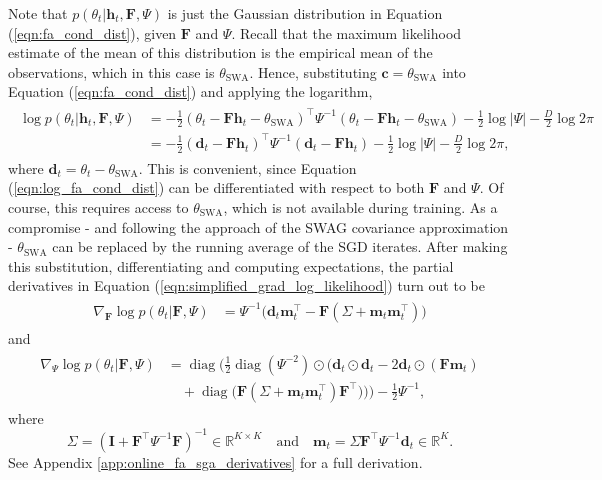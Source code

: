 \documentclass[msc,deptreport.inf]{infthesis} %
\newcommand{\matr}[1]{\mathbf{#1}}
\newcommand{\R}{\mathbb R}
\newcommand{\diag}{\mathop{\mathrm{diag}}}
\begin{document}
Note that $p(\theta_t | \matr{h}_t, \matr{F}, \Psi)$ is just the Gaussian distribution in Equation (\ref{eqn:fa_cond_dist}), given $\matr{F}$ and $\Psi$. Recall that the maximum likelihood estimate of the mean of this distribution is the empirical mean of the observations, which in this case is $\theta_{\text{SWA}}$. Hence, substituting $\matr{c} = \theta_{\text{SWA}}$ into Equation (\ref{eqn:fa_cond_dist}) and applying the logarithm,
\begin{align}\label{eqn:log_fa_cond_dist}
\begin{split}
	\log p(\theta_t | \matr{h}_t, \matr{F}, \Psi)
	& = -\frac{1}{2} (\theta_t - \matr{Fh}_t - \theta_{\text{SWA}})^\intercal \Psi^{-1} (\theta_t - \matr{Fh}_t - \theta_{\text{SWA}}) - \frac{1}{2} \log |\Psi| - \frac{D}{2} \log 2\pi \\
	& = -\frac{1}{2} (\matr{d}_t - \matr{Fh}_t)^\intercal \Psi^{-1} (\matr{d}_t - \matr{Fh}_t) - \frac{1}{2} \log |\Psi| - \frac{D}{2} \log 2\pi,
\end{split}
\end{align}
where $\matr{d}_t = \theta_t - \theta_{\text{SWA}}$. This is convenient, since Equation (\ref{eqn:log_fa_cond_dist}) can be differentiated with respect to both $\matr{F}$ and $\Psi$. Of course, this requires access to $\theta_{\text{SWA}}$, which is not available during training. As a compromise - and following the approach of the SWAG covariance approximation - $\theta_{\text{SWA}}$ can be replaced by the running average of the SGD iterates. After making this substitution, differentiating and computing expectations, the partial derivatives in Equation (\ref{eqn:simplified_grad_log_likelihood}) turn out to be
\begin{align}\label{eqn:derivatives_wrt_F}
\begin{split}
	\nabla_{\matr{F}} \log p(\theta_t | \matr{F}, \Psi) 
	& = \Psi^{-1} \big(\matr{d}_t \matr{m}_t^\intercal - \matr{F}  (\Sigma + \matr{m}_t \matr{m}_t^\intercal)\big)
\end{split}
\end{align} 
and
\begin{align}
\begin{split}\label{eqn:derivatives_wrt_Psi}
	\nabla_{\Psi} \log p(\theta_t | \matr{F}, \Psi) 
	& = \diag\Bigg(\frac{1}{2} \diag(\Psi^{-2}) \odot \Big(\matr{d}_t \odot \matr{d}_t - 2\matr{d}_t \odot (\matr{F} \matr{m}_t) \\
	& \quad + \diag\big( \matr{F} (\Sigma + \matr{m}_t \matr{m}_t^\intercal) \matr{F}^\intercal \big) \Big) \Bigg)
	 - \frac{1}{2} \Psi^{-1},
\end{split}
\end{align} 
where
\begin{equation}\label{eqn:variational_params}
	\Sigma = (\matr{I} + \matr{F}^\intercal \Psi^{-1} \matr{F})^{-1} \in \R^{K \times K}
	\quad \text{and} \quad \matr{m}_t = \Sigma \matr{F}^\intercal \Psi^{-1} \matr{d}_t \in \R^K.
\end{equation}
See Appendix \ref{app:online_fa_sga_derivatives} for a full derivation.
\end{document}
